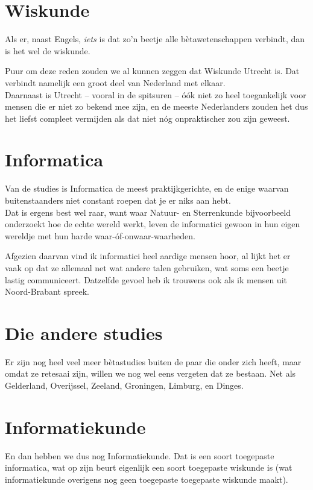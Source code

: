 \documentclass[print]{vakidioot}
\begin{document}
\begin{multicols}{2}
        \section*{Wiskunde}
        Als er, naast Engels, \textit{iets} is dat zo'n beetje alle bètawetenschappen verbindt, dan is het wel de wiskunde.
        
        Puur om deze reden zouden we al kunnen zeggen dat Wiskunde Utrecht is. Dat verbindt namelijk een groot deel van Nederland met elkaar.\\
        Daarnaast is Utrecht -- vooral in de spitsuren -- óók niet zo heel toegankelijk voor mensen die er niet zo bekend mee zijn, en de meeste Nederlanders zouden het dus het liefst compleet vermijden als dat niet nóg onpraktischer zou zijn geweest.
        
        \section*{Informatica}
        Van de \aesnaam{}studies is Informatica de meest praktijkgerichte, en de enige waarvan buitenstaanders niet constant roepen dat je er niks aan hebt.\\
        Dat is ergens best wel raar, want waar Natuur- en Sterrenkunde bijvoorbeeld onderzoekt hoe de echte wereld werkt, leven de informatici gewoon in hun eigen wereldje met hun harde waar-óf-onwaar-waarheden.
        
        Afgezien daarvan vind ik informatici heel aardige mensen hoor, al lijkt het er vaak op dat ze allemaal net wat andere talen gebruiken, wat soms een beetje lastig communiceert. Datzelfde gevoel heb ik trouwens ook als ik mensen uit Noord-Brabant spreek.
        
        \section*{Die andere studies}
        Er zijn nog heel veel meer b\`etastudies buiten de paar die \aesnaam onder zich heeft, maar omdat ze retesaai zijn, willen we nog wel eens vergeten dat ze bestaan. Net als Gelderland, Overijssel, Zeeland, Groningen, Limburg, en Dinges.

        \columnbreak
        
        \section*{\vspace{-1.5\baselineskip}Informatiekunde}
        En dan hebben we dus nog Informatiekunde. Dat is een soort toegepaste informatica, wat op zijn beurt eigenlijk een soort toegepaste wiskunde is (wat informatiekunde overigens nog geen toegepaste toegepaste wiskunde maakt).
        

\end{multicols}
\end{document}
